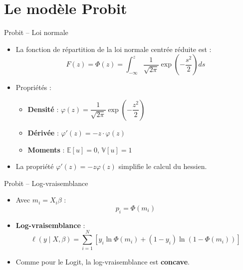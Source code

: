 \documentclass[11pt,aspectratio=169]{beamer}
\newcommand{\E}{\mathbb{E}}
\newcommand{\V}{\mathbb{V}}
\begin{document}
\section{Le modèle Probit}

\begin{frame}{Probit -- Loi normale}

\begin{itemize}

\item La fonction de répartition de la loi normale centrée réduite est :
  \[
  F(z) = \Phi(z) = \int_{-\infty}^{z} \frac{1}{\sqrt{2\pi}} \exp\left(-\frac{s^2}{2}\right) ds
  \]

\item Propriétés :
  \begin{itemize}
  \item \textbf{Densité} : $\varphi(z) = \dfrac{1}{\sqrt{2\pi}} \exp\left(-\dfrac{z^2}{2}\right)$\newline
  \item \textbf{Dérivée} : $\varphi'(z) = -z \cdot \varphi(z)$\newline
  \item \textbf{Moments} : $\E[u] = 0$, $\V[u] = 1$
  \end{itemize}

\item La propriété $\varphi'(z) = -z \varphi(z)$ simplifie le calcul du
  hessien.

\end{itemize}

\end{frame}

\begin{frame}{Probit -- Log-vraisemblance}

\begin{itemize}

\item Avec $m_i = X_i \beta$ :
  \[
  p_i = \Phi(m_i)
  \]

\item \textbf{Log-vraisemblance} :
  \[
  \ell(y \mid X, \beta) = \sum_{i=1}^{N} \left[ y_i \ln \Phi(m_i) + (1-y_i) \ln(1 - \Phi(m_i)) \right]
  \]

\item Comme pour le Logit, la log-vraisemblance est \textbf{concave}.

\end{itemize}

\end{frame}
\end{document}
